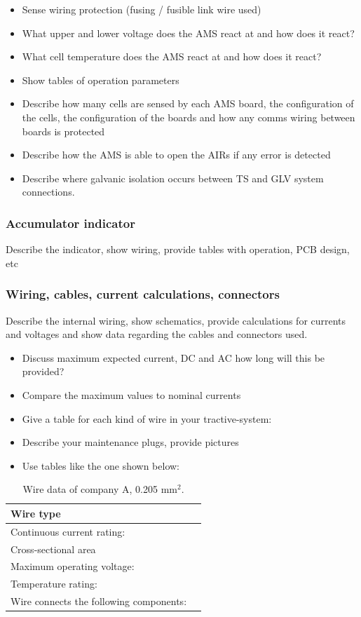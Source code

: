 \begin{itemize}
	\item 	Sense wiring protection (fusing / fusible link wire used)
	\item What upper and lower voltage does the AMS react at and how does it react?
	\item What cell temperature does the AMS react at and how does it react?
	\item Show tables of operation parameters
	\item Describe how many cells are sensed by each AMS board, the configuration of the cells, the configuration of the boards and how any comms wiring between boards is protected 
	\item Describe how the AMS is able to open the AIRs if any error is detected
	\item Describe where galvanic isolation occurs between TS and GLV system connections.
\end{itemize}

\subsubsection{Accumulator indicator}
Describe the indicator, show wiring, provide tables with operation, PCB design, etc

\subsubsection{Wiring, cables, current calculations, connectors}
Describe the internal wiring, show schematics, provide calculations for currents and voltages and show data regarding the cables and connectors used.
\begin{itemize}
	\item 	Discuss maximum expected current, DC and AC how long will this be provided?
	\item Compare the maximum values to nominal currents
	\item Give a table for each kind of wire in your tractive-system:
	\item Describe your maintenance plugs, provide pictures
	\item Use tables like the one shown below:
\end{itemize}

\begin{table}[htbp]
	\centering
	\caption{Wire data of company A, 0.205 mm$^2$.}
	\begin{tabularx}{\textwidth}{|X|X|}\hline
		Wire type &  \\[\TableSize]\hline
		Continuous current rating: &  \\[\TableSize]\hline
		Cross-sectional area &  \\[\TableSize]\hline
		Maximum operating voltage: &  \\[\TableSize]\hline
		Temperature rating: &  \\[\TableSize]\hline
		Wire connects the following components: &  \\[\TableSize]\hline
	\end{tabularx}%
	\label{tab:acc-wire}%
\end{table}%


